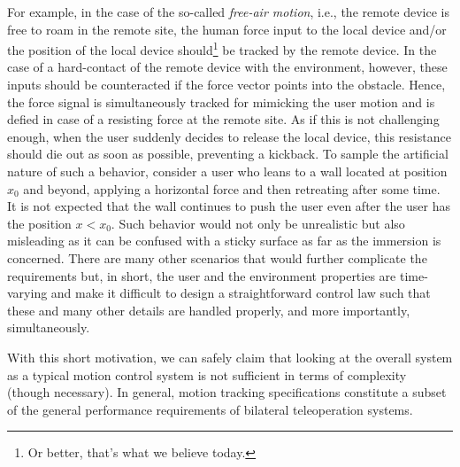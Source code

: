 For example, in the case of the so-called \emph{free-air motion}, i.e., the remote device is free 
to roam in the remote site, the human force input to the local device and/or the position of the 
local device should\footnote{Or better, that's what we believe today.} 
be tracked by the remote device. In the case of a hard-contact of the remote device with the environment, however, 
these inputs should be counteracted if the force vector points into the obstacle. Hence, the force signal is 
simultaneously tracked for mimicking the user motion and is defied in case of a resisting force at the remote 
site. As if this is not challenging enough, when the user suddenly decides to release the local device, this 
resistance should die out as soon as possible, preventing a kickback. To sample the artificial nature of such 
a behavior, consider a user who leans to a wall located at position $x_0$ and beyond, applying a horizontal 
force and then retreating after some time. It is not expected that the wall continues to push the user even 
after the user has the position $x<x_0$. Such behavior would not only be unrealistic but also misleading as 
it can be confused with a sticky surface as far as the immersion is concerned. There are many other scenarios 
that would further complicate the requirements but, in short, the user and the environment properties are 
time-varying and make it difficult to design a straightforward control law such that these and many other details 
are handled properly, and more importantly, simultaneously. 


With this short motivation, we can safely claim that looking at the overall system as a typical motion control 
system is not sufficient in terms of complexity (though necessary). In general, motion tracking specifications 
constitute a subset of the general performance requirements of bilateral teleoperation systems. 



